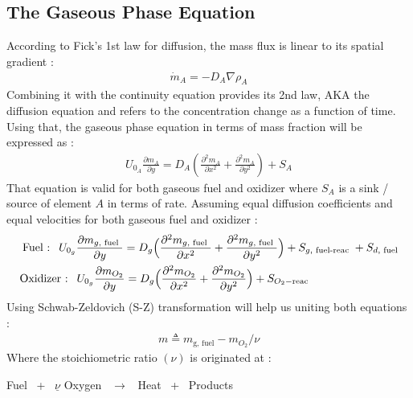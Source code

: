 \documentclass[12pt]{article}
\numberwithin{equation}{section}
\begin{document}
\begin{flushleft}
\newpage

\subsection{The Gaseous Phase Equation}

According to Fick's 1st law for diffusion, the mass flux is linear to its spatial gradient :
\begin{align} 
\dot{m}_{A}=-D_{A} \nabla \rho_{A}
\end{align}
Combining it with the continuity equation provides its 2nd law, AKA the diffusion equation and refers to the concentration change as a function of time. Using that, the gaseous phase
equation in terms of mass fraction will be expressed as :
\begin{align} 
U_{0_{A}} \frac{\partial m_{A}}{\partial y}=D_{A}\left(\frac{\partial^{2} m_{A}}{\partial x^{2}}+\frac{\partial^{2} m_{A}}{\partial y^{2}}\right)+S_{A}
\end{align}
That equation is valid for both gaseous fuel and oxidizer where $S_{A}$ is a sink / source of element $A$ in terms of rate. Assuming equal diffusion coefficients and equal velocities for both gaseous fuel and oxidizer :
\begin{align} 
\text { Fuel : } \ U_{0_{g}} \frac{\partial m_{g, \text { fuel }}}{\partial y}=D_{g} \Big( \frac{\partial^{2} m_{g, \text { fuel }}}{\partial x^{2}}+\frac{\partial^{2} m_{g, \text { \text{fuel} }}}{\partial y^{2}} \Big)+S_{g, \text { fuel-reac }}+S_{d, \text { fuel }} \label{3_fuel} \\
\text { Oxidizer : } \ U_{0_{g}} \frac{\partial m_{O_{2}}}{\partial y}=D_{g} \Big( \frac{\partial^{2} m_{O_{2}}}{\partial x^{2}}+\frac{\partial^{2} m_{O_{2}}}{\partial y^{2}} \Big)+S_{O_{2}-\text{reac}} \hspace{29mm} \label{3_oxidizer}
\end{align}
Using Schwab-Zeldovich (S-Z) transformation will help us uniting both equations :
\begin{align} 
m \triangleq m_{\text{g, fuel}}-m_{O_{2}} / \nu
\end{align}
Where the stoichiometric ratio $(\nu)$ is originated at :

\hspace{45mm} Fuel \ + \ $\underline{\nu}$ Oxygen \ $\rightarrow$ \ Heat \ + \ Products 


\end{flushleft}
\end{document}
